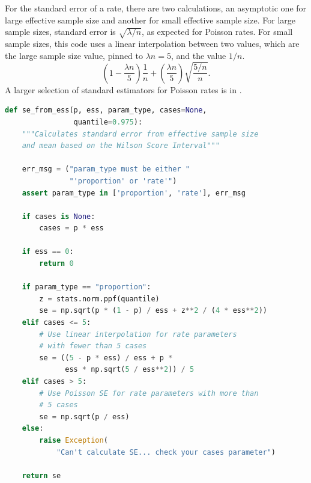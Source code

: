 \documentclass[fleqn,10pt]{olplainarticle}
\begin{document}
For the standard error of a rate, there are two calculations, an asymptotic one
for large effective sample size and another for small effective sample size.
For large sample sizes, standard error is $\sqrt{\lambda/n}$, as expected for Poisson
rates. For small sample sizes, this code uses a linear interpolation between two values,
which are the large sample size value, pinned to $\lambda n=5$, and the value $1/n$.
\begin{equation}
    \left(1-\frac{\lambda n}{5}\right) \frac{1}{n} + \left(\frac{\lambda n}{5}\right)\sqrt{\frac{5/n}{n}}.
\end{equation}
A larger selection of standard estimators for Poisson rates is in \citet{patil2012}.

\begin{lstlisting}[language=Python]
def se_from_ess(p, ess, param_type, cases=None,
                quantile=0.975):
    """Calculates standard error from effective sample size
    and mean based on the Wilson Score Interval"""

    err_msg = ("param_type must be either "
               "'proportion' or 'rate'")
    assert param_type in ['proportion', 'rate'], err_msg

    if cases is None:
        cases = p * ess

    if ess == 0:
        return 0

    if param_type == "proportion":
        z = stats.norm.ppf(quantile)
        se = np.sqrt(p * (1 - p) / ess + z**2 / (4 * ess**2))
    elif cases <= 5:
        # Use linear interpolation for rate parameters
        # with fewer than 5 cases
        se = ((5 - p * ess) / ess + p *
              ess * np.sqrt(5 / ess**2)) / 5
    elif cases > 5:
        # Use Poisson SE for rate parameters with more than
        # 5 cases
        se = np.sqrt(p / ess)
    else:
        raise Exception(
            "Can't calculate SE... check your cases parameter")

    return se
\end{lstlisting}
\end{document}
